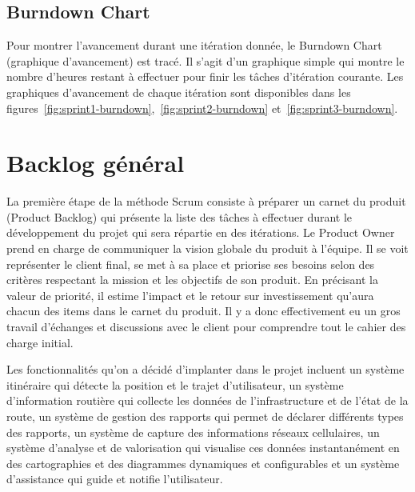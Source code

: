 
\subsection{Burndown Chart}

Pour montrer l'avancement durant une itération donnée, le Burndown Chart
(graphique d'avancement) est tracé. Il s'agit d'un graphique simple qui montre
le nombre d'heures restant à effectuer pour finir les tâches d'itération
courante. Les graphiques d'avancement de chaque itération sont disponibles dans
les figures~\ref{fig:sprint1-burndown},~\ref{fig:sprint2-burndown}
et~\ref{fig:sprint3-burndown}.

\section{Backlog général}

La première étape de la méthode Scrum consiste à préparer un carnet du produit
(Product Backlog) qui présente la liste des tâches à effectuer durant le
développement du projet qui sera répartie en des itérations. Le Product Owner
prend en charge de communiquer la vision globale du produit à l'équipe. Il se
voit représenter le client final, se met à sa place et priorise ses besoins
selon des critères respectant la mission et les objectifs de son produit. En
précisant la valeur de priorité, il estime l'impact et le retour sur
investissement qu'aura chacun des items dans le carnet du produit. Il y a donc
effectivement eu un gros travail d'échanges et discussions avec le client pour
comprendre tout le cahier des charge initial.

Les fonctionnalités qu'on a décidé d'implanter dans le projet  incluent un système itinéraire qui détecte la position et le trajet
d'utilisateur, un système d'information routière qui collecte les données de
l'infrastructure et de l'état de la route, un système de gestion des rapports
qui permet de déclarer différents types des rapports, un système de capture des
informations réseaux cellulaires, un système d'analyse et de valorisation qui
visualise ces données instantanément en des cartographies et des diagrammes
dynamiques et configurables et un système d'assistance qui guide et notifie
l'utilisateur.

